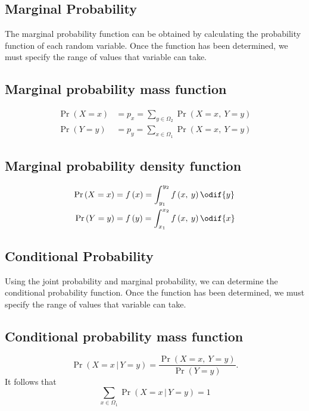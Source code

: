 \documentclass{article}
\begin{document}
\begin{multicols}{3}
    \subsection{Marginal Probability}
    The marginal probability function can be obtained by calculating the probability function of each random variable.
    Once the function has been determined, we must specify the range of values that variable can take.
    \subsection{Marginal probability mass function}
    \begin{align*}
        \Pr{\left( X = x \right)} & = p_x = \sum_{y \in \Omega_2} \Pr{\left( X = x,\: Y = y \right)} \\
        \Pr{\left( Y = y \right)} & = p_y = \sum_{x \in \Omega_1} \Pr{\left( X = x,\: Y = y \right)}
    \end{align*}
    \subsection{Marginal probability density function}
    \begin{align*}
        \Pr{\left( X = x \right)} & = f\left( x \right) = \int_{y_1}^{y_2} f\left( x,\: y \right) \odif{y} \\
        \Pr{\left( Y = y \right)} & = f\left( y \right) = \int_{x_1}^{x_2} f\left( x,\: y \right) \odif{x}
    \end{align*}
    \subsection{Conditional Probability}
    Using the joint probability and marginal probability, we can determine the conditional probability function.
    Once the function has been determined, we must specify the range of values that variable can take.
    \subsection{Conditional probability mass function}
    \begin{equation*}
        \Pr{\left( X = x \,\vert\, Y = y \right)} = \frac{\Pr{\left( X = x,\: Y = y \right)}}{\Pr{\left( Y = y \right)}}.
    \end{equation*}
    It follows that
    \begin{equation*}
        \sum_{x \in \Omega_1} \Pr{\left( X = x \,\vert\, Y = y \right)} = 1
    \end{equation*}

\end{multicols}
\end{document}
